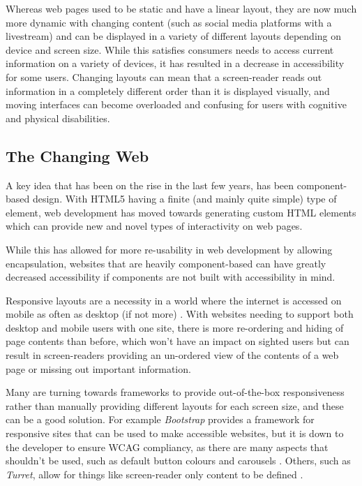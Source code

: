 \documentclass[ %
                    author={Aleena Baig},
                supervisor={Dr Simon Lock},
                    degree={BSc},
                     title={On Making Web Accessible Graphs},
                  subtitle={},
                      year={2019} ]{dissertation}
\begin{document}
Whereas web pages used to be static and have a linear layout, they are now much more dynamic with changing content (such as social media platforms with a livestream) and can be displayed in a variety of different layouts depending on device and screen size. While this satisfies consumers needs to access current information on a variety of devices, it has resulted in a decrease in accessibility for some users. Changing layouts can mean that a screen-reader reads out information in a completely different order than it is displayed visually, and moving interfaces can become overloaded and confusing for users with cognitive and physical disabilities.

\subsection{The Changing Web}

A key idea that has been on the rise in the last few years, has been component-based design. With HTML5 having a finite (and mainly quite simple) type of element, web development has moved towards generating custom HTML elements which can provide new and novel types of interactivity on web pages.

While this has allowed for more re-usability in web development by allowing encapsulation, websites that are heavily component-based can have greatly decreased accessibility if components are not built with accessibility in mind.

Responsive layouts are a necessity in a world where the internet is accessed on mobile as often as desktop (if not more) \cite{mobileusestudy}. With websites needing to support both desktop and mobile users with one site, there is more re-ordering and hiding of page contents than before, which won't have an impact on sighted users but can result in screen-readers providing an un-ordered view of the contents of a web page or missing out important information.

Many are turning towards frameworks to provide out-of-the-box responsiveness rather than manually providing different layouts for each screen size, and these can be a good solution. For example \textit{Bootstrap} provides a framework for responsive sites that can be used to make accessible websites, but it is down to the developer to ensure WCAG compliancy, as there are many aspects that shouldn't be used, such as default button colours and carousels \cite{bootstrapaccessibility}. Others, such as \textit{Turret}, allow for things like screen-reader only content to be defined \cite{turretaccessibility}.
\end{document}

